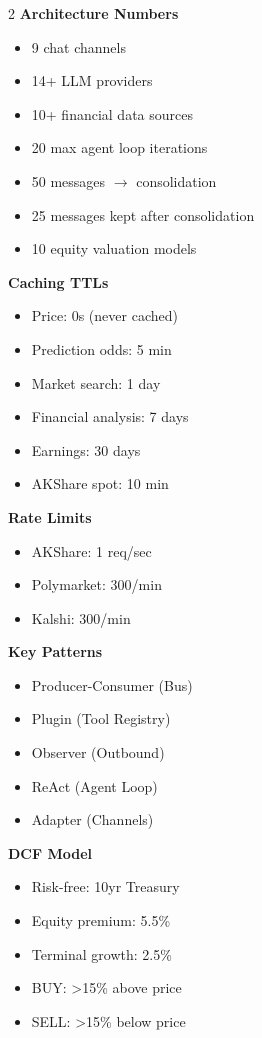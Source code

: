 \documentclass[11pt,a4paper]{article}
\begin{document}
\begin{multicols}{2}
\textbf{Architecture Numbers}
\begin{itemize}[nosep,leftmargin=*]
\item 9 chat channels
\item 14+ LLM providers
\item 10+ financial data sources
\item 20 max agent loop iterations
\item 50 messages $\rightarrow$ consolidation
\item 25 messages kept after consolidation
\item 10 equity valuation models
\end{itemize}

\textbf{Caching TTLs}
\begin{itemize}[nosep,leftmargin=*]
\item Price: 0s (never cached)
\item Prediction odds: 5 min
\item Market search: 1 day
\item Financial analysis: 7 days
\item Earnings: 30 days
\item AKShare spot: 10 min
\end{itemize}

\textbf{Rate Limits}
\begin{itemize}[nosep,leftmargin=*]
\item AKShare: 1 req/sec
\item Polymarket: 300/min
\item Kalshi: 300/min
\end{itemize}

\textbf{Key Patterns}
\begin{itemize}[nosep,leftmargin=*]
\item Producer-Consumer (Bus)
\item Plugin (Tool Registry)
\item Observer (Outbound)
\item ReAct (Agent Loop)
\item Adapter (Channels)
\end{itemize}

\textbf{DCF Model}
\begin{itemize}[nosep,leftmargin=*]
\item Risk-free: 10yr Treasury
\item Equity premium: 5.5\%
\item Terminal growth: 2.5\%
\item BUY: >15\% above price
\item SELL: >15\% below price
\end{itemize}


\end{multicols}
\end{document}

